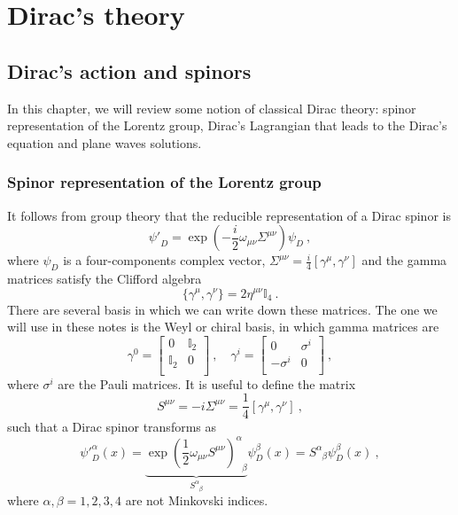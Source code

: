 \part{Dirac's theory}

\chapter{Dirac's action and spinors}

    In this chapter, we will review some notion of classical Dirac theory: spinor representation of the Lorentz group, Dirac's Lagrangian that leads to the Dirac's equation and plane waves solutions.

\section{Spinor representation of the Lorentz group}    

    It follows from group theory that the reducible representation of a Dirac spinor is 
    \begin{equation*}
        {\psi'}_D = \exp(-\frac{i}{2} \omega_{\mu\nu} \Sigma^{\mu\nu}) \psi_D ~,
    \end{equation*}
    where $\psi_D$ is a four-components complex vector, $\Sigma^{\mu\nu} = \frac{i}{4} [\gamma^\mu, \gamma^\nu]$ and the gamma matrices satisfy the Clifford algebra
    \begin{equation*}
        \{\gamma^\mu, \gamma^\nu\} = 2 \eta^{\mu\nu} \mathbb I_4 ~.
    \end{equation*}
    There are several basis in which we can write down these matrices. The one we will use in these notes is the Weyl or chiral basis, in which gamma matrices are
    \begin{equation*}
        \gamma^0 = \begin{bmatrix}
            0 & \mathbb I_2 \\ \mathbb I_2 & 0 \\ 
        \end{bmatrix} ~, \quad \gamma^i = \begin{bmatrix}
            0 & \sigma^i \\ - \sigma^i & 0 \\ 
        \end{bmatrix} ~,
    \end{equation*}
    where $\sigma^i$ are the Pauli matrices. It is useful to define the matrix 
    \begin{equation*}
        S^{\mu\nu} = - i \Sigma^{\mu\nu} = \frac{1}{4} [\gamma^\mu, \gamma^\nu] ~,
    \end{equation*}
    such that a Dirac spinor transforms as
    \begin{equation}\label{lorspin}
        {\psi'}_D^\alpha (x) = \underbrace{\exp(\frac{1}{2} \omega_{\mu\nu} S^{\mu\nu})^\alpha_{\phantom \alpha \beta}}_{S^\alpha_{\phantom \alpha \beta} } \psi^\beta_D (x) = S^\alpha_{\phantom \alpha \beta} \psi^\beta_D (x) ~,
    \end{equation}
    where $\alpha, \beta = 1,2,3,4$ are not Minkovski indices.

